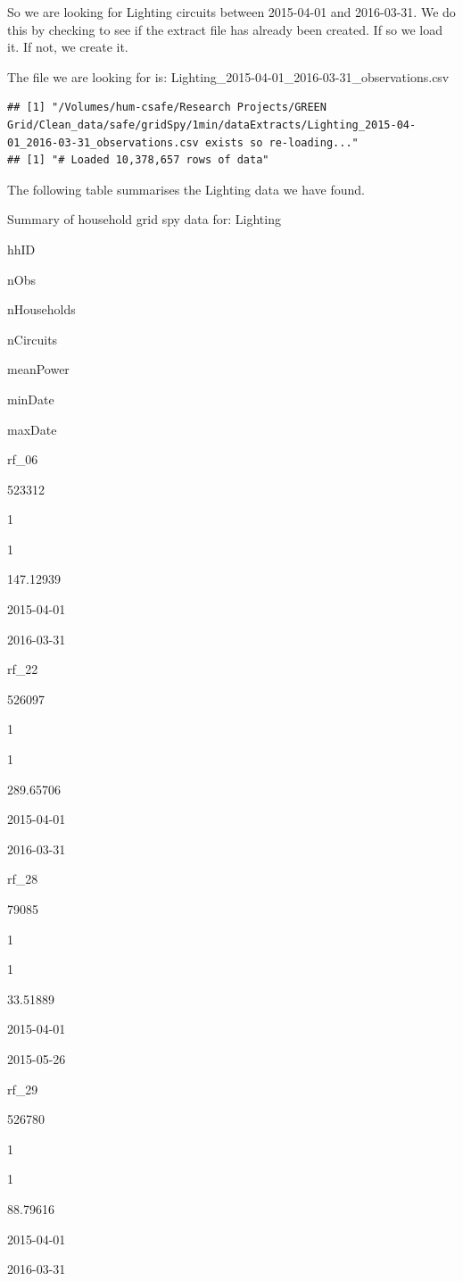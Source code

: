 \documentclass[]{article}
\begin{document}
So we are looking for Lighting circuits between 2015-04-01 and
2016-03-31. We do this by checking to see if the extract file has
already been created. If so we load it. If not, we create it.

The file we are looking for is:
Lighting\_2015-04-01\_2016-03-31\_observations.csv

\begin{verbatim}
## [1] "/Volumes/hum-csafe/Research Projects/GREEN Grid/Clean_data/safe/gridSpy/1min/dataExtracts/Lighting_2015-04-01_2016-03-31_observations.csv exists so re-loading..."
## [1] "# Loaded 10,378,657 rows of data"
\end{verbatim}

The following table summarises the Lighting data we have found.

Summary of household grid spy data for: Lighting

hhID

nObs

nHouseholds

nCircuits

meanPower

minDate

maxDate

rf\_06

523312

1

1

147.12939

2015-04-01

2016-03-31

rf\_22

526097

1

1

289.65706

2015-04-01

2016-03-31

rf\_28

79085

1

1

33.51889

2015-04-01

2015-05-26

rf\_29

526780

1

1

88.79616

2015-04-01

2016-03-31
\end{document}
